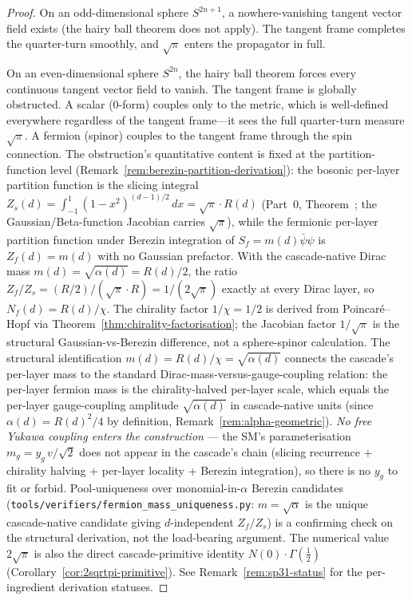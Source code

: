 \documentclass[12pt,a4paper]{article}
\begin{document}
\begin{proof}
On an odd-dimensional sphere $S^{2n+1}$, a nowhere-vanishing tangent vector
field exists (the hairy ball theorem does not apply). The tangent frame
completes the quarter-turn smoothly, and $\sqrt{\pi}$ enters the propagator
in full.

On an even-dimensional sphere $S^{2n}$, the hairy ball theorem forces every
continuous tangent vector field to vanish. The tangent frame is globally
obstructed. A scalar (0-form) couples only to the metric, which is
well-defined everywhere regardless of the tangent frame---it sees the full
quarter-turn measure $\sqrt{\pi}$. A fermion (spinor) couples to the tangent
frame through the spin connection. The obstruction's quantitative content
is fixed at the partition-function level (Remark~\ref{rem:berezin-partition-derivation}):
the bosonic per-layer partition function is the slicing integral
$Z_s(d) = \int_{-1}^1(1-x^2)^{(d-1)/2}\,dx = \sqrt{\pi}\cdot R(d)$
(Part~0, Theorem~; the Gaussian/Beta-function Jacobian carries
$\sqrt{\pi}$), while the fermionic per-layer partition function under
Berezin integration of $S_f = m(d)\bar\psi\psi$ is $Z_f(d) = m(d)$ with
no Gaussian prefactor. With the cascade-native Dirac mass
$m(d) = \sqrt{\alpha(d)} = R(d)/2$, the ratio
$Z_f/Z_s = (R/2)/(\sqrt{\pi}\cdot R) = 1/(2\sqrt{\pi})$ exactly at every
Dirac layer, so $N_f(d) = R(d)/\chi$. The chirality factor $1/\chi = 1/2$
is derived from Poincar\'e--Hopf via Theorem~\ref{thm:chirality-factorisation};
the Jacobian factor $1/\sqrt{\pi}$ is the structural Gaussian-vs-Berezin
difference, not a sphere-spinor calculation. The structural
identification $m(d) = R(d)/\chi = \sqrt{\alpha(d)}$ connects the cascade's
per-layer mass to the standard Dirac-mass-versus-gauge-coupling relation:
the per-layer fermion mass is the chirality-halved per-layer scale, which
equals the per-layer gauge-coupling amplitude $\sqrt{\alpha(d)}$ in
cascade-native units (since $\alpha(d) = R(d)^2/4$ by definition,
Remark~\ref{rem:alpha-geometric}). \emph{No free Yukawa coupling enters
the construction} --- the SM's parameterisation $m_g = y_g\,v/\sqrt{2}$
does not appear in the cascade's chain (slicing recurrence + chirality
halving + per-layer locality + Berezin integration), so there is no
$y_g$ to fit or forbid.
Pool-uniqueness over monomial-in-$\alpha$ Berezin candidates
(\texttt{tools/verifiers/fermion\_mass\_uniqueness.py}: $m = \sqrt{\alpha}$
is the unique cascade-native candidate giving $d$-independent $Z_f/Z_s$)
is a confirming check on the structural derivation, not the
load-bearing argument.
The numerical value $2\sqrt{\pi}$ is also the direct cascade-primitive
identity $N(0)\cdot\Gamma(\tfrac12)$ (Corollary~\ref{cor:2sqrtpi-primitive}).
See Remark~\ref{rem:sp31-status} for the per-ingredient derivation
statuses.


\end{proof}
\end{document}
